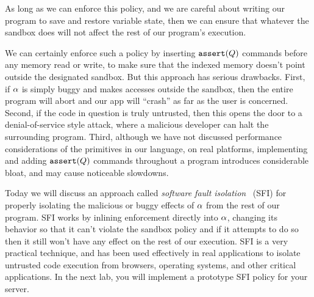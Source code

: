 \documentclass[11pt,twoside]{scrartcl}
\begin{document}
\begin{center}
\end{center}
As long as we can enforce this policy, and we are careful about writing our program to save and restore variable state, then we can ensure that whatever the sandbox does will not affect the rest of our program's execution.

We can certainly enforce such a policy by inserting $\texttt{\upshape assert}(Q)$ commands before any memory read or write, to make sure that the indexed memory doesn't point outside the designated sandbox. But this approach has serious drawbacks. First, if $\alpha$ is simply buggy and makes accesses outside the sandbox, then the entire program will abort and our app will ``crash'' as far as the user is concerned. 
Second, if the code in question is truly untrusted, then this opens the door to a denial-of-service style attack, where a malicious developer can halt the surrounding program.
Third, although we have not discussed performance considerations of the primitives in our language, on real platforms, implementing and adding $\texttt{\upshape assert}(Q)$ commands throughout a program introduces considerable bloat, and may cause noticeable slowdowns.

Today we will discuss an approach called \emph{software fault isolation}~\cite{Sehr2010,Yee2009} (SFI) for properly isolating the malicious or buggy effects of $\alpha$ from the rest of our program. SFI works by inlining enforcement directly into $\alpha$, changing its behavior so that it can't violate the sandbox policy and if it attempts to do so then it still won't have any effect on the rest of our execution. SFI is a very practical technique, and has been used effectively in real applications to isolate untrusted code execution from browsers, operating systems, and other critical applications. In the next lab, you will implement a prototype SFI policy for your server.
\end{document}
